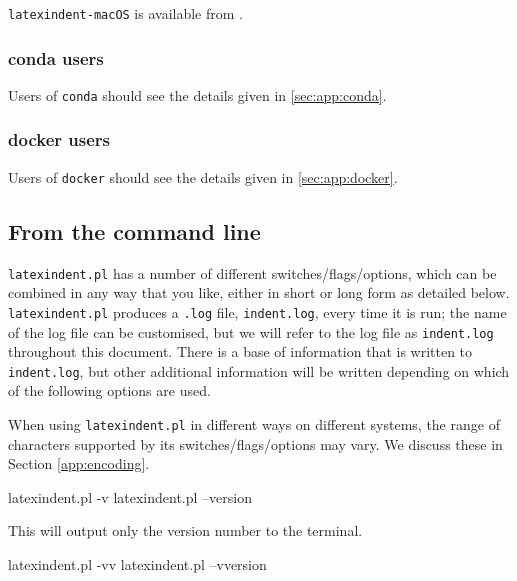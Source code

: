 \documentclass[10pt]{article}
\newcommand{\flagbox}[1]{%
 \par
 \makebox[30pt][l]{%
  \hspace{-1cm}%
  \ttfamily\fontseries{b}\selectfont #1
 }%
}
\begin{document}
 \texttt{latexindent-macOS} is available from \cite{latexindent-home}.

\subsubsection{conda users}
 Users of \texttt{conda} should see the details given in \cref{sec:app:conda}.

\subsubsection{docker users}
 Users of \texttt{docker} should see the details given in \cref{sec:app:docker}.

\subsection{From the command line}\label{sec:commandline}
 \texttt{latexindent.pl} has a number of different switches/flags/options, which
 can be combined in any way that you like, either in short or long form as detailed below.
 \texttt{latexindent.pl} produces a \texttt{.log} file, \texttt{indent.log}, every time it
 is run; the name of the log file can be customised, but we will refer to the log file as
 \texttt{indent.log} throughout this document. There is a base of information that is
 written to \texttt{indent.log}, but other additional information will be written
 depending on which of the following options are used.

 When using \texttt{latexindent.pl} in different ways on different systems, the range of
 characters supported by its switches/flags/options may vary. We discuss these in Section
 \cref{app:encoding}.

\flagbox{-v, --version}

 \begin{commandshell}
latexindent.pl -v
latexindent.pl --version
\end{commandshell}

 This will output only the version number to the terminal.

\flagbox{-vv, --vversion}

 \begin{commandshell}
latexindent.pl -vv
latexindent.pl --vversion
\end{commandshell}
\end{document}
